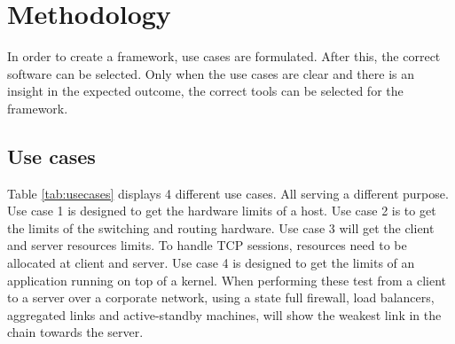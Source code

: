 \chapter{Methodology}\label{ch:method}

In order to create a framework, use cases are formulated.
After this, the correct software can be selected. Only when the use cases are clear and there is an insight in the expected outcome, the correct tools can be selected for the framework. 

\section{Use cases}\label{sec:usecase}

Table \ref{tab:usecases} displays 4 different use cases. All serving a different purpose.
Use case 1 is designed to get the hardware limits of a host. Use case 2 is to get the limits of the  switching and routing hardware.
Use case 3 will get the client and server resources limits. To handle TCP sessions, resources need to be allocated at client and server. 
Use case 4 is designed to get the limits of an application running on top of a kernel. 
When performing these test from a client to a server over a corporate network, using a state full firewall, load balancers, aggregated links and active-standby machines, will show the weakest link in the chain towards the server.  

